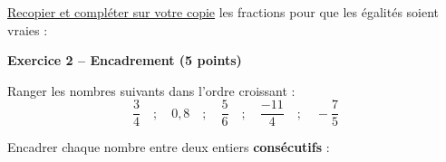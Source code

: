 \documentclass[12pt,a4paper]{exam}
\begin{document}
\begin{questions}
    \question[3] \underline{Recopier et compléter sur votre copie} les fractions pour que 
    les égalités soient vraies :
    \vspace{5pt}
\end{questions}

\noindent\hrulefill
\vspace{0.5cm}


\textbf{Exercice 2 – Encadrement (5 points)}
\vspace{5pt}

\begin{questions}
    \question[2] Ranger les nombres suivants dans l’ordre croissant :
    \[
    \dfrac{3}{4} \quad ; \quad 0,8 \quad ; \quad \dfrac{5}{6} \quad ; \quad \dfrac{-11}{4} 
    \quad ; \quad -\dfrac{7}{5}
    \]

    \question[3] Encadrer chaque nombre entre deux entiers \textbf{consécutifs} :
\end{questions}
\end{document}
